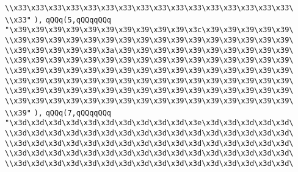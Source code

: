 \verb|\\x33\x33\x33\x33\x33\x33\x33\x33\x33\x33\x33\x33\x33\x33\x33\x33\|\newline
\verb|\\x33"|\newline
\verb|),|\newline
\verb|qQQq(5,qQQqqQQq|\newline
\verb|"\x39\x39\x39\x39\x39\x39\x39\x39\x39\x39\x3c\x39\x39\x39\x39\x39\|\newline
\verb|\\x39\x39\x39\x39\x39\x39\x39\x39\x39\x39\x39\x39\x39\x39\x39\x39\|\newline
\verb|\\x39\x39\x39\x39\x39\x3a\x39\x39\x39\x39\x39\x39\x39\x39\x39\x39\|\newline
\verb|\\x39\x39\x39\x39\x39\x39\x39\x39\x39\x39\x39\x39\x39\x39\x39\x39\|\newline
\verb|\\x39\x39\x39\x39\x39\x39\x39\x39\x39\x39\x39\x39\x39\x39\x39\x39\|\newline
\verb|\\x39\x39\x39\x39\x39\x39\x39\x39\x39\x39\x39\x39\x39\x39\x39\x39\|\newline
\verb|\\x39\x39\x39\x39\x39\x39\x39\x39\x39\x39\x39\x39\x39\x39\x39\x39\|\newline
\verb|\\x39\x39\x39\x39\x39\x39\x39\x39\x39\x39\x39\x39\x39\x39\x39\x39\|\newline
\verb|\\x39"|\newline
\verb|),|\newline
\verb|qQQq(7,qQQqqQQq|\newline
\verb|"\x3d\x3d\x3d\x3d\x3d\x3d\x3d\x3d\x3d\x3d\x3e\x3d\x3d\x3d\x3d\x3d\|\newline
\verb|\\x3d\x3d\x3d\x3d\x3d\x3d\x3d\x3d\x3d\x3d\x3d\x3d\x3d\x3d\x3d\x3d\|\newline
\verb|\\x3d\x3d\x3d\x3d\x3d\x3d\x3d\x3d\x3d\x3d\x3d\x3d\x3d\x3d\x3d\x3d\|\newline
\verb|\\x3d\x3d\x3d\x3d\x3d\x3d\x3d\x3d\x3d\x3d\x3d\x3d\x3d\x3d\x3d\x3d\|\newline
\verb|\\x3d\x3d\x3d\x3d\x3d\x3d\x3d\x3d\x3d\x3d\x3d\x3d\x3d\x3d\x3d\x3d\|\newline
